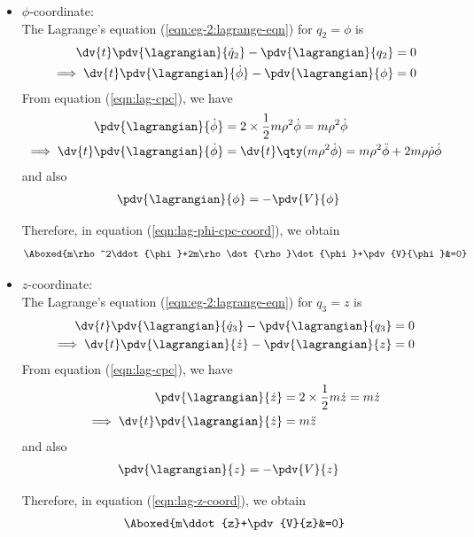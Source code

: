 \begin{enumerate}
\begin{itemize}
		\item $\phi$-coordinate:\\
		The Lagrange's equation (\ref{eqn:eg-2:lagrange-eqn}) for $q_2=\phi$ is
		\begin{align}
			\dv{t}\pdv{\lagrangian}{\dot{q}_2}-\pdv{\lagrangian}{q_2}&=0 \nonumber\\
			\implies\dv{t}\pdv{\lagrangian}{\dot{\phi}}-\pdv{\lagrangian}{\phi}&=0 \label{eqn:lag-phi-cpc-coord}
		\end{align}
		From equation (\ref{eqn:lag-cpc}), we have
		\begin{align*}
			\pdv{\lagrangian}{\dot{\phi}}&=2\times\dfrac{1}{2}m\rho^2\dot{\phi}=m\rho^2\dot{\phi} \\
			\implies\dv{t}\pdv{\lagrangian}{\dot{\phi}}&=\dv{t}\qty(m\rho^2\dot{\phi})=m\rho^2\ddot{\phi}+2m\rho\dot{\rho}\dot{\phi}
		\end{align*}
		and also
		\begin{align*}
			\pdv{\lagrangian}{\phi}&=-\pdv{V}{\phi}
		\end{align*}
		
		Therefore, in equation (\ref{eqn:lag-phi-cpc-coord}), we obtain
		\begin{align*}
			\Aboxed{m\rho^2\ddot{\phi}+2m\rho\dot{\rho}\dot{\phi}+\pdv{V}{\phi}&=0}
		\end{align*}
		
		\item $z$-coordinate:\\
		The Lagrange's equation (\ref{eqn:eg-2:lagrange-eqn}) for $q_3=z$ is
		\begin{align}
			\dv{t}\pdv{\lagrangian}{\dot{q}_3}-\pdv{\lagrangian}{q_3}&=0 \nonumber\\
			\implies\dv{t}\pdv{\lagrangian}{\dot{z}}-\pdv{\lagrangian}{z}&=0 \label{eqn:lag-z-coord}
		\end{align}
		From equation (\ref{eqn:lag-cpc}), we have
		\begin{align*}
			\pdv{\lagrangian}{\dot{z}}&=2\times\dfrac{1}{2}m\dot{z}=m\dot{z} \\
			\implies\dv{t}\pdv{\lagrangian}{\dot{z}}&=m\ddot{z}
		\end{align*}
		and also
		\begin{align*}
			\pdv{\lagrangian}{z}&=-\pdv{V}{z}
		\end{align*}
		
		Therefore, in equation (\ref{eqn:lag-z-coord}), we obtain
		\begin{align*}
			\Aboxed{m\ddot{z}+\pdv{V}{z}&=0}
		\end{align*}
	\end{itemize}
	

\end{enumerate}
